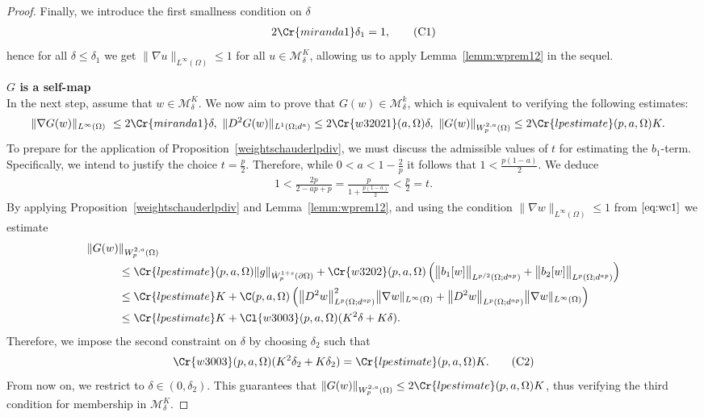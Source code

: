 \documentclass[12pt,a4paper,twoside]{article}
\newcommand{\M}{\mathcal {M}}
\newcommand {\cb}[1] {\tikz[baseline=(char.base)]{
            \node[shape=circle,draw,inner sep=2pt] (char) {\itshape{\textbf{#1}}};}}
\begin{document}
\begin{proof}
Finally, we introduce the first smallness condition on $\delta$
\begin{align}
   2 \Cr{miranda1}
    \delta_1 = 1, \tag{C1} \label{eq:wc1}
\end{align}
hence for all $\delta\le \delta_1$ we get $\|\nabla u\|_{L^\infty({\Omega})}\le1$ for all $u\in \M_\delta^K$, allowing us to apply  Lemma~\ref{lemm:wprem12} in the sequel.

\noindent\cb{2} \textbf{$G$ is a self-map}\\
In the next step, assume that $w\in \M^K_\delta $. We now aim to prove that $G(w)\in \M^k_\delta$, which is equivalent to verifying the following estimates:
\begin{align*}
     \|\nabla G(w)\|_{L^\infty(\Omega)} &\ \le 2 \Cr{miranda1} \delta, \ 
     \|D^2 G(w)\|_{L^1(\Omega;d^{a})}\le 2\Cr{w32021}(a,\Omega) \delta, \ \|G(w)\|_{W^{2,a}_p(\Omega)} \le 2\Cr{lpestimate}(p,a,\Omega) K. 
\end{align*}
To prepare for the application of Proposition~\ref{weightschauderlpdiv}, we must discuss the admissible values of $t$ for estimating the $b_1$-term. Specifically, we intend to justify the choice  $t=\frac p2$. Therefore, while $0< a< 1-\frac{2}{p}$ it follows that $1<\frac{p(1-a)}2$. We deduce 
 \begin{align}
 1<    \frac{2p}{2-ap+p} = \frac{p}{1+\frac{p(1-a)}{2}} <\frac{p}{2} =t. \label{eq:wpaest}
 \end{align}
By applying Proposition~\ref{weightschauderlpdiv} and Lemma~\ref{lemm:wprem12}, and using the condition $\| \nabla w\|_{L^\infty({\Omega})}\le1$ from $\eqref{eq:wc1}$  we estimate
\begin{align*}
    \|G(w)& 
    \| _{W^{2,a}_p(\Omega)}\\
     &\le 
    \Cr{lpestimate}(p,a,\Omega) 
   \|  
    g  \|_{ \dot W^{1+s}_p (\partial\Omega)} 
     + 
        \Cr{w3202}(p,a,\Omega)  \left(
   \big \|b_1[w] \big\|_{L^{p/2}(\Omega ;d^{ap})}
   +  \big\|b_2[w] \big\|_{L^{p}(\Omega ;d^{ap})}
    \right)
    \\
    &\le \Cr{lpestimate}
    K
    +
    \C(p,a,\Omega) \left( \big\| D^2w\big\|_{L^p(\Omega;d^{ap})}^2 \big\|\nabla w\|_{L^\infty(\Omega)}  
   + \big\| D^2w\big\|_{L^p(\Omega;d^{ap})} \big\|\nabla w\|_{L^\infty(\Omega)}      \right)\\
     &\le \Cr{lpestimate}   K  + \Cl{w3003}(p,a,\Omega)( K^2 \delta +  K \delta ).
 \end{align*}
 Therefore, we impose the second constraint on $\delta$ by choosing  $\delta_2$ such that 
 \begin{align}
    \Cr{w3003}(p, a, \Omega)( K^2 \delta_2 +K \delta_2 )= \Cr{lpestimate}(p,a,\Omega) K. \label{eq:wc2} \tag{C2} 
 \end{align}
From now on, we restrict to $\delta\in (0,\delta_2)$. This guarantees that $ \|G(w)\| _{W^{2,a}_p(\Omega)} \le 2\Cr{lpestimate}(p,a,\Omega)K$, thus verifying the third condition for membership in $\M_\delta^K$. 


\end{proof}
\end{document}
